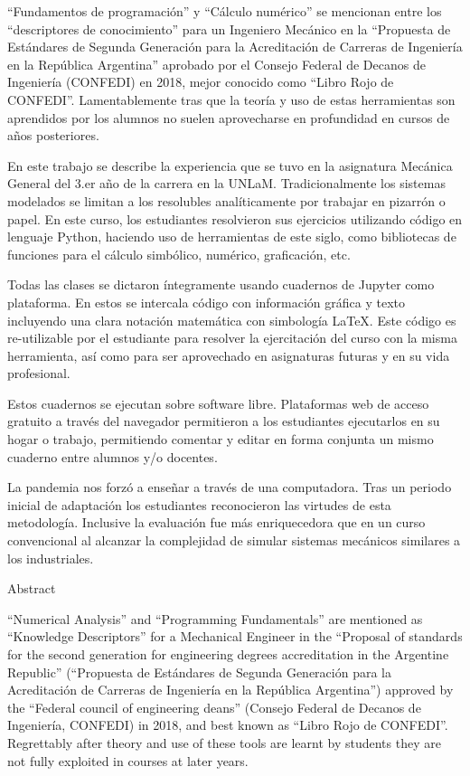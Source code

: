 “Fundamentos de programación” y “Cálculo numérico” se mencionan entre los “descriptores de conocimiento” para un Ingeniero Mecánico en la “Propuesta de Estándares de Segunda Generación para la Acreditación de Carreras de Ingeniería en la República Argentina” aprobado por el Consejo Federal de Decanos de Ingeniería (CONFEDI) en 2018, mejor conocido como “Libro Rojo de CONFEDI”. Lamentablemente tras que la teoría y uso de estas herramientas son aprendidos por los alumnos no suelen aprovecharse en profundidad en cursos de años posteriores.

En este trabajo se describe la experiencia que se tuvo en la asignatura Mecánica General del 3.er año de la carrera en la UNLaM. Tradicionalmente los sistemas modelados se limitan a los resolubles analíticamente por trabajar en pizarrón o papel. En este curso, los estudiantes resolvieron sus ejercicios utilizando código en lenguaje Python, haciendo uso de herramientas de este siglo, como bibliotecas de funciones para el cálculo simbólico, numérico, graficación, etc.

Todas las clases se dictaron íntegramente usando cuadernos de Jupyter como plataforma. En estos se intercala código con información gráfica y texto incluyendo una clara notación matemática con simbología LaTeX. Este código es re-utilizable por el estudiante para resolver la ejercitación del curso con la misma herramienta, así como para ser aprovechado en asignaturas futuras y en su vida profesional.

Estos cuadernos se ejecutan sobre software libre. Plataformas web de acceso gratuito a través del navegador permitieron a los estudiantes ejecutarlos en su hogar o trabajo, permitiendo comentar y editar en forma conjunta un mismo cuaderno entre alumnos y/o docentes.

La pandemia nos forzó a enseñar a través de una computadora. Tras un periodo inicial de adaptación los estudiantes reconocieron las virtudes de esta metodología. Inclusive la evaluación fue más enriquecedora que en un curso convencional al alcanzar la complejidad de simular sistemas mecánicos similares a los industriales.\par\bigskip

Abstract\par\medskip

“Numerical Analysis” and “Programming Fundamentals'' are mentioned as “Knowledge Descriptors'' for a Mechanical Engineer in the “Proposal of standards for the second generation for engineering degrees accreditation in the Argentine Republic” (“Propuesta de Estándares de Segunda Generación para la Acreditación de Carreras de Ingeniería en la República Argentina”) approved by the “Federal council of engineering deans” (Consejo Federal de Decanos de Ingeniería, CONFEDI) in 2018, and best known as “Libro Rojo de CONFEDI”. Regrettably after theory and use of these tools are learnt by students they are not fully exploited in courses at later years.


